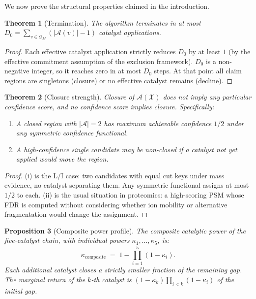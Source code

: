 \documentclass[11pt,a4paper]{article}
\newtheorem{theorem}{Theorem}[section]
\newtheorem{proposition}[theorem]{Proposition}
\theoremstyle{definition}
\theoremstyle{remark}
\newcommand{\amb}{\mathcal{A}}
\newcommand{\Pep}{\mathcal{Q}}
\newcommand{\Spec}{\mathcal{X}}
\newcommand{\pot}{\kappa}
\begin{document}
We now prove the structural properties claimed in the introduction.

\begin{theorem}[Termination]
\label{thm:termination}
The algorithm terminates in at most $D_0=\sum_{v\in\Pep_M}(|\amb(v)|-1)$
catalyst applications.
\end{theorem}

\begin{proof}
Each effective catalyst application strictly reduces $D_0$ by at least
$1$ (by the effective commitment assumption of the exclusion framework).
$D_0$ is a non-negative integer, so it reaches zero in at most $D_0$
steps. At that point all claim regions are singletons (closure) or no
effective catalyst remains (decline).
\end{proof}

\begin{theorem}[Closure strength]
\label{thm:closure-strength}
Closure of $\amb(\Spec)$ does not imply any particular confidence score,
and no confidence score implies closure. Specifically:
\begin{enumerate}[label=(\roman*),itemsep=1pt]
  \item A closed region with $|\amb|=2$ has maximum achievable
  confidence $1/2$ under any symmetric confidence functional.
  \item A high-confidence single candidate may be non-closed if a
  catalyst not yet applied would move the region.
\end{enumerate}
\end{theorem}

\begin{proof}
(i) is the L/I case: two candidates with equal cut keys under mass
evidence, no catalyst separating them. Any symmetric functional assigns
at most $1/2$ to each. (ii) is the usual situation in proteomics: a
high-scoring PSM whose FDR is computed without considering whether ion
mobility or alternative fragmentation would change the assignment.
\end{proof}

\begin{proposition}[Composite power profile]
\label{prop:composite}
The composite catalytic power of the five-catalyst chain, with
individual powers $\pot_1,\dots,\pot_5$, is:
\[
  \pot_{\mathrm{composite}}
  \;=\;
  1-\prod_{i=1}^{5}(1-\pot_i).
\]
Each additional catalyst closes a strictly smaller fraction of the
remaining gap. The marginal return of the $k$-th catalyst is
$(1-\pot_k)\prod_{i<k}(1-\pot_i)$ of the initial gap.
\end{proposition}
\end{document}
